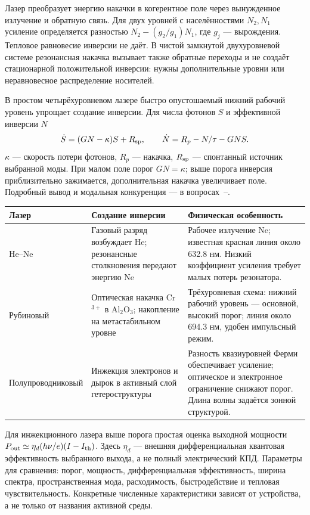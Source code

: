 
Лазер преобразует энергию накачки в когерентное поле через вынужденное излучение и обратную связь. Для двух уровней с населённостями $N_2,N_1$ усиление определяется разностью $N_2-(g_2/g_1)N_1$, где $g_j$ — вырождения. Тепловое равновесие инверсии не даёт. В чистой замкнутой двухуровневой системе резонансная накачка вызывает также обратные переходы и не создаёт стационарной положительной инверсии: нужны дополнительные уровни или неравновесное распределение носителей.

В простом четырёхуровневом лазере быстро опустошаемый нижний рабочий уровень упрощает создание инверсии. Для числа фотонов $S$ и эффективной инверсии $N$
\begin{equation}
 \dot S=(GN-\kappa)S+R_{\rm sp},\qquad
 \dot N=R_p-N/\tau-GNS.
\end{equation}
$\kappa$ — скорость потери фотонов, $R_p$ — накачка, $R_{\rm sp}$ — спонтанный источник выбранной моды. При малом поле порог $GN=\kappa$; выше порога инверсия приблизительно зажимается, дополнительная накачка увеличивает поле. Подробный вывод и модальная конкуренция — в вопросах~--.

\begin{center}\small
\begin{tabular}{p{.16\linewidth}p{.30\linewidth}p{.42\linewidth}}
\toprule
Лазер & Создание инверсии & Физическая особенность\\\midrule
He--Ne & Газовый разряд возбуждает He; резонансные столкновения передают энергию Ne & Рабочее излучение Ne; известная красная линия около 632.8 нм. Низкий коэффициент усиления требует малых потерь резонатора.\\
Рубиновый & Оптическая накачка Cr$^{3+}$ в Al$_2$O$_3$; накопление на метастабильном уровне & Трёхуровневая схема: нижний рабочий уровень — основной, высокий порог; линия около 694.3 нм, удобен импульсный режим.\\
Полупро\-воднико\-вый & Инжекция электронов и дырок в активный слой гетероструктуры & Разность квазиуровней Ферми обеспечивает усиление; оптическое и электронное ограничение снижают порог. Длина волны задаётся зонной структурой.\\\bottomrule
\end{tabular}\end{center}
Для инжекционного лазера выше порога простая оценка выходной мощности $P_{\rm out}\simeq\eta_d(h\nu/e)(I-I_{\rm th})$. Здесь $\eta_d$ — внешняя дифференциальная квантовая эффективность выбранного выхода, а не полный электрический КПД. Параметры для сравнения: порог, мощность, дифференциальная эффективность, ширина спектра, пространственная мода, расходимость, быстродействие и тепловая чувствительность. Конкретные численные характеристики зависят от устройства, а не только от названия активной среды.
